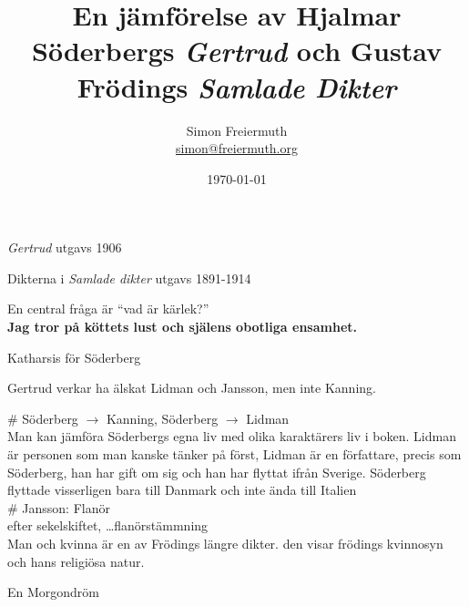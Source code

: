 \documentclass[12pt, letterpaper, twoside]{article}
\title{En jämförelse av Hjalmar Söderbergs \textit{Gertrud} och Gustav Frödings \textit{Samlade Dikter}}
\author{Simon Freiermuth \\ \href{mailto:simon@freiermuth.org}{simon@freiermuth.org}}
\date{\today}
\begin{document}
\maketitle

\textit{Gertrud} utgavs 1906

Dikterna i \textit{Samlade dikter} utgavs 1891-1914


\begin{flushleft}


\hfill

En central fråga är ``vad är kärlek?''\\

\textbf{Jag tror på köttets lust och själens obotliga ensamhet.}

Katharsis för Söderberg

Gertrud verkar ha älskat Lidman och Jansson, men inte Kanning.

	\# Söderberg $\rightarrow$ Kanning, Söderberg $\rightarrow$ Lidman\\
Man kan jämföra Söderbergs egna liv med olika karaktärers liv i boken. Lidman är personen som man kanske tänker på först,
Lidman är en författare, precis som Söderberg, han har gift om sig och han har flyttat ifrån Sverige.
Söderberg flyttade visserligen bara till Danmark och inte ända till Italien\\

	\# Jansson: Flanör\\
efter sekelskiftet, \dots flanörstämmning\\

Man och kvinna är en av Frödings längre dikter. den visar frödings kvinnosyn och hans religiösa natur.

En Morgondröm %

\end{flushleft}
\end{document}
